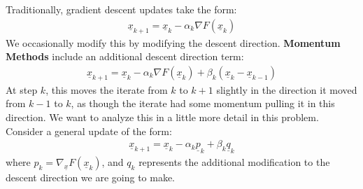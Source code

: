 \documentclass[11pt,letterpaper]{article}
\begin{document}
\begin{flushleft}
    \justifying
    Traditionally, gradient descent updates take the form:
    \begin{align}
        \underline x_{k+1} = \underline x_k - \alpha_k \nabla F(\underline x_k)
    \end{align}
    We occasionally modify this by modifying the descent direction. \textbf{Momentum Methods} include an additional descent direction term:
    \begin{align}
        \underline x_{k+1} = \underline x_k - \alpha_k \nabla F(\underline x_k)
        + \beta_k(\underline x_k - \underline x_{k-1})
    \end{align}
    At step $k$, this moves the iterate from $k$ to $k + 1$ slightly in the direction it moved from $k - 1$ to $k$, as though the iterate had some momentum pulling it in this direction. We want to analyze this in a little more detail in this problem.\\
    Consider a general update of the form:
    \begin{align}
        \underline x_{k+1} = \underline x_k - \alpha_k \underline p_k
        + \beta_k \underline q_k
    \end{align}
    where $p_k = \nabla_{\underline x}F(\underline x_k)$, and $q_k$ represents the additional modification to the descent direction we are going to make.
\end{flushleft}
\end{document}

